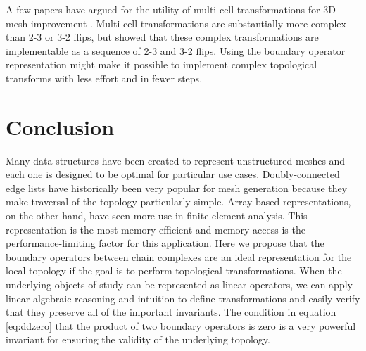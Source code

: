 \documentclass[twocolumn]{article}
\begin{document}
A few papers have argued for the utility of multi-cell transformations for 3D mesh improvement \cite{klingner2008aggressive}.
Multi-cell transformations are substantially more complex than 2-3 or 3-2 flips, but \cite{misztal2009tetrahedral} showed that these complex transformations are implementable as a sequence of 2-3 and 3-2 flips.
Using the boundary operator representation might make it possible to implement complex topological transforms with less effort and in fewer steps.


\section{Conclusion}

Many data structures have been created to represent unstructured meshes and each one is designed to be optimal for particular use cases.
Doubly-connected edge lists have historically been very popular for mesh generation because they make traversal of the topology particularly simple.
Array-based representations, on the other hand, have seen more use in finite element analysis.
This representation is the most memory efficient and memory access is the performance-limiting factor for this application.
Here we propose that the boundary operators between chain complexes are an ideal representation for the local topology if the goal is to perform topological transformations.
When the underlying objects of study can be represented as linear operators, we can apply linear algebraic reasoning and intuition to define transformations and easily verify that they preserve all of the important invariants.
The condition in equation \eqref{eq:ddzero} that the product of two boundary operators is zero is a very powerful invariant for ensuring the validity of the underlying topology.



\end{document}
